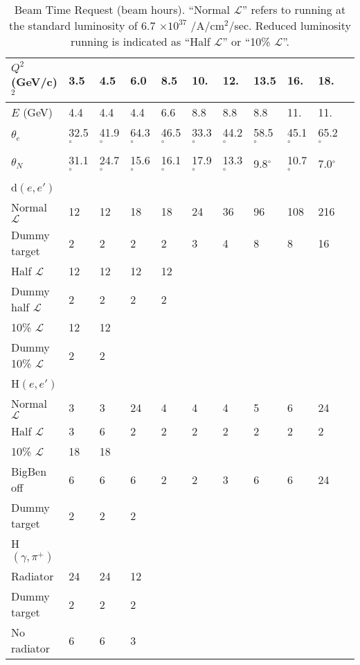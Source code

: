 \documentclass[12pt,letterpaper,oneside]{article}
\begin{document}
\begin{table}
\begin{center}
\caption{
Beam Time Request (beam hours).  ``Normal $\mathcal{L}$'' refers to
running at the standard luminosity of 6.7 $\times 10^{37}$ /A/cm$^2$/sec.
Reduced luminosity running is indicated as ``Half $\mathcal{L}$'' or
``10\% $\mathcal{L}$''.
\label{beam_request}}
\vspace{.2in}
{\begin{tabular}{|l|l|l|l|l|l|l|l|l|l|l|}
\hline
$Q^2$ (GeV/c)$^2$&3.5& 4.5&6.0& 8.5&10.&12.&13.5&16.&18.&\\
\hline
$E$ (GeV)&4.4& 4.4& 4.4&6.6&8.8&8.8&8.8&11.&11.&\\
\hline
$\theta_e$&32.5$^\circ$&
41.9$^\circ$&64.3$^\circ$&46.5$^\circ$&33.3$^\circ$&44.2$^\circ$
&58.5$^\circ$&45.1$^\circ$&65.2$^\circ$&\\
\hline
$\theta_{N}$&31.1$^\circ$&
24.7$^\circ$&15.6$^\circ$&16.1$^\circ$&17.9$^\circ$&13.3$^\circ$
&9.8$^\circ$&10.7$^\circ$&7.0$^\circ$&\\
\hline
\hline
d$(e,e')$\\
\hline
Normal $\mathcal{L}$&12&12&18&18&24&36&96&108&216&\\
\hline
Dummy target&2&2&2&2&3&4&8&8&16&\\
\hline
Half  $\mathcal{L}$&12&12&12&12&&&&&&\\
\hline
Dummy half $\mathcal{L}$&2&2&2&2&&&&&&\\
\hline
 10\% $\mathcal{L}$&12&12&&&&&&&&\\
\hline
Dummy 10\% $\mathcal{L}$&2&2&&&&&&&&\\
\hline
\hline
H$(e,e')$\\
\hline
Normal $\mathcal{L}$&3&3&24&4&4&4&5&6&24&\\
\hline
Half  $\mathcal{L}$&3&6&2&2&2&2&2&2&2&\\
\hline
10\%  $\mathcal{L}$&18&18&&&&&&&&\\
\hline
BigBen off&6&6&6&2&2&3&6&6&24&\\
\hline
Dummy target&2&2&2&&&&&&&\\
\hline
\hline
H$(\gamma,\pi^+)$\\
\hline
Radiator&24&24&12&&&&&&&\\
\hline
Dummy target&2&2&2&&&&&&&\\
\hline
No radiator&6&6&3&&&&&&&\\
\hline
\hline



\end{tabular}}
\end{center}
\end{table}
\end{document}
